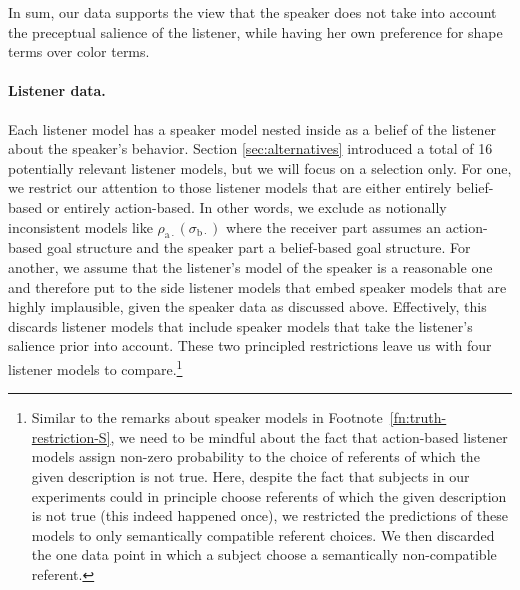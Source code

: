 \begin{figure}[htb]
  \label{fig:cost_post_s}
\end{figure}
%
In sum, our data supports the view that the speaker does not take into
account the preceptual salience of the listener, while having her own
preference for shape terms over color terms.


\paragraph{Listener data.} Each listener model has a speaker model
nested inside as a belief of the listener about the speaker's
behavior. Section \ref{sec:alternatives} introduced a total of 16
potentially relevant listener models, but we will focus on a selection
only. For one, we restrict our attention to those listener models that
are either entirely belief-based or entirely action-based. In other
words, we exclude as notionally inconsistent models like
$\rho_{\mathrm{a}\cdot}(\sigma_{\mathrm{b}\cdot})$ where the receiver
part assumes an action-based goal structure and the speaker part a
belief-based goal structure. For another, we assume that the
listener's model of the speaker is a reasonable one and therefore put
to the side listener models that embed speaker models that are highly
implausible, given the speaker data as discussed above. Effectively,
this discards listener models that include speaker models that take
the listener's salience prior into account. These two principled
restrictions leave us with four listener models to
compare.\footnote{Similar to the remarks about speaker models in
  Footnote~\ref{fn:truth-restriction-S}, we need to be mindful about
  the fact that action-based listener models assign non-zero
  probability to the choice of referents of which the given
  description is not true. Here, despite the fact that subjects in our
  experiments could in principle choose referents of which the given
  description is not true (this indeed happened once), we restricted
  the predictions of these models to only semantically compatible
  referent choices. We then discarded the one data point in which a
  subject choose a semantically non-compatible referent.}

